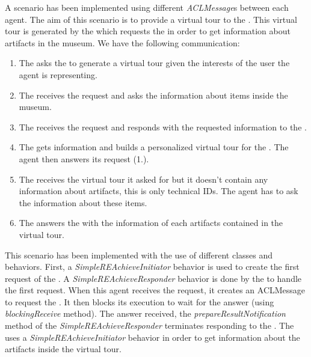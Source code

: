 \documentclass[a4paper,11pt]{article}
\begin{document}
  A scenario has been implemented using different \textit{ACLMessage}s between each agent. The aim of this scenario is to provide a virtual tour to the \pa{}. This 
  virtual tour is generated by the \to{} which requests the \cu{} in order to get information about artifacts in the museum. We have the following communication:
  \begin{enumerate}
   \item The \pa{} asks the \to{} to generate a virtual tour given the interests of the user the agent is representing.
   \item The \to{} receives the request and asks the \cu{} information about items inside the museum.
   \item The \cu{} receives the request and responds with the requested information to the \to{}.
   \item The \to{} gets information and builds a personalized virtual tour for the \cu{}. The agent then answers its request (1.).
   \item The \pa{} receives the virtual tour it asked for but it doesn't contain any information about artifacts, this is only technical IDs. The agent has to ask 
   the \cu{} information about these items.
   \item The \cu{} answers the \pa{} with the information of each artifacts contained in the virtual tour.
  \end{enumerate}
  
  This scenario has been implemented with the use of different classes and behaviors. First, a \textit{SimpleREAchieveInitiator} behavior is used to create the 
  first request of the \pa{}. A \textit{SimpleREAchieveResponder} behavior is done by the \to{} to handle the first request. When this agent receives the request, 
  it creates an ACLMessage to request the \cu{}. It then blocks its execution to wait for the answer (using \textit{blockingReceive} method). The answer received, 
  the \textit{prepareResultNotification} method of the \textit{SimpleREAchieveResponder} terminates responding to the \pa{}. The \pa{} uses a \textit{SimpleREAchieveInitiator} 
  behavior in order to get information about the artifacts inside the virtual tour.

  
% 
% 
\end{document}
